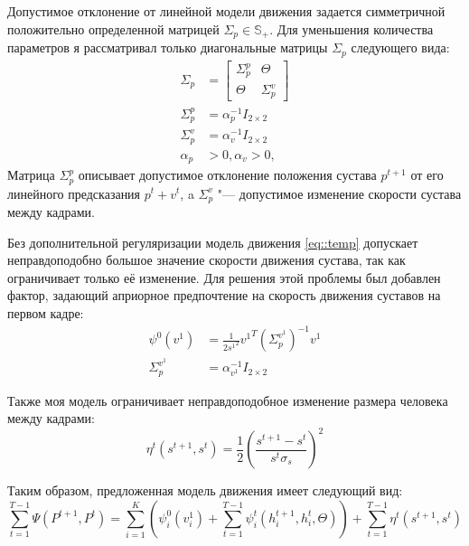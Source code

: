 Допустимое отклонение от линейной модели движения задается симметричной положительно определенной матрицей $\Sigma_p \in \mathbb{S_+}$. Для уменьшения количества параметров я рассматривал только диагональные матрицы $\Sigma_p$ следующего вида:
\begin{equation}
	\begin{aligned}
		\Sigma_p &= \left[
			\begin{array}{c|c}
			\Sigma_p^p & \Theta \\ \hline
			\Theta     & \Sigma_p^v
			\end{array}
			\right] \\
		\Sigma_p^p &= \alpha_p^{-1} I_{2\times2} \\
		\Sigma_p^v &= \alpha_v^{-1} I_{2\times2} \\
		\alpha_p &> 0, \alpha_v > 0,
		\label{eq::sigma}
	\end{aligned}
\end{equation}
Матрица $\Sigma_p^p$ описывает допустимое отклонение положения сустава $p^{t+1}$ от его линейного предсказания $p^t + v^t$, a $\Sigma_p^v$ "--- допустимое изменение скорости сустава между кадрами.

Без дополнительной регуляризации модель движения \eqref{eq::temp} допускает неправдоподобно большое значение скорости движения сустава, так как ограничивает только её изменение. Для решения этой проблемы был добавлен фактор, задающий априорное предпочтение на скорость движения суставов на первом кадре:
\begin{equation}
	\begin{aligned}
		\psi^0(v^1) &= \frac{1}{2 {s^1}^2}{v^1}^T \left({\Sigma_p^{v^1}}\right)^{-1} v^1 \\
		\Sigma_p^{v^1} &= \alpha_{v^1}^{-1} I_{2\times2}
	\end{aligned}
\end{equation}

Также моя модель ограничивает неправдоподобное изменение размера человека между кадрами:
\begin{equation}
	\eta^t(s^{t+1}, s^t) = \frac{1}{2} \left(\frac{s^{t+1} - s^t}{s^t\sigma_s}\right)^2
\end{equation}

Таким образом, предложенная модель движения имеет следующий вид:
\begin{equation}
	\sum_{t=1}^{T-1}{\Psi(P^{t+1}, P^t)} = 
		\sum_{i=1}^K\left(\psi^0_i(v^1_i) + \sum_{t=1}^{T-1}\psi_i^t(h_i^{t+1}, h_i^{t}, \Theta) \right) + \sum_{t=1}^{T-1} \eta^t(s^{t+1}, s^{t})
	\label{eq::motion_model}
\end{equation}

